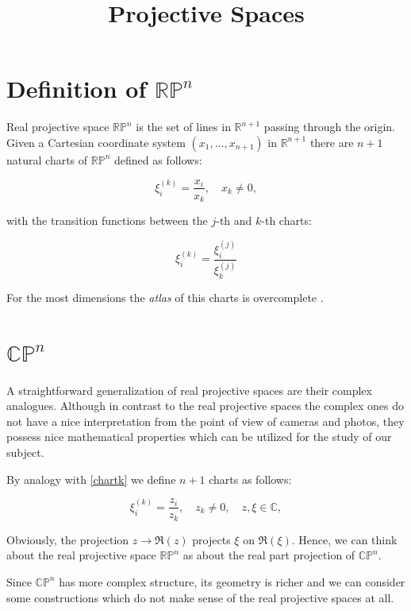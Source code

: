 \documentclass[a4paper,10pt]{article}
\title{Projective Spaces}
\author{}
\date{}
\begin{document}
\maketitle
\section{Definition of $\mathbb{RP}^n$}

Real projective space $\mathbb{RP}^n$ is the set of lines in $\mathbb{R}^{n+1}$ passing through the origin. Given a Cartesian coordinate system $(x_1,\ldots, x_{n+1})$ in $\mathbb{R}^{n+1}$ there are $n+1$ natural charts of $\mathbb{RP}^n$ defined as follows:

\begin{equation}
 \xi_i^{(k)} = \frac{x_i}{x_k}, \quad x_k\neq 0 \label{chartk},
\end{equation}

with the transition functions between the $j$-th and $k$-th charts:

\begin{equation}
 \xi^{(k)}_i = \frac{\xi^{(j)}_i }{\xi^{(j)}_k }
\end{equation}

For the most dimensions the {\it atlas } of this charts is overcomplete \cite{mhopkins}.

\section{$\mathbb{CP}^n$}

A straightforward generalization of real projective spaces are their complex analogues. Although in contrast to the real projective spaces the complex ones do not have a nice interpretation from the point of view of cameras and photos, they possess nice mathematical properties which can be utilized for the study of our subject. 

By analogy with \eqref{chartk} we define $n+1$ charts as follows:

\begin{equation}
 \xi_i^{(k)} = \frac{z_i}{z_k}, \quad z_k\neq 0, \quad z, \xi \in \mathbb{C} \label{cchartk},
\end{equation}

Obviously, the projection $z\to \Re{(z)}$ projects $\xi$ on $\Re{(\xi)}$. Hence, we can think about the real projective space $\mathbb{RP}^n$ as about the real part projection of $\mathbb{CP}^n$. 

Since $\mathbb{CP}^n$ has more complex structure, its geometry is richer and we can consider some constructions which do not make sense of the real projective spaces at all.
\end{document}
